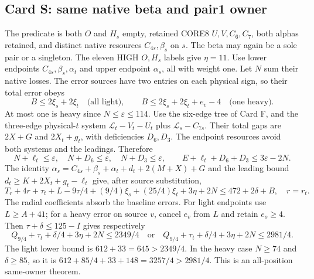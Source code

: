 \documentclass[11pt,letterpaper]{article}
\theoremstyle{definition}\newtheorem{definition}[theorem]{Definition}
\begin{document}
\subsection{Card S: same native beta and pair1 owner}\label{sec:z4-cardS}
The predicate is both $O$ and $H_s$ empty, retained CORE8 $U,V,C_6,C_7$, both alphas retained, and distinct native resources $C_{4s},\beta_s$ on $s$. The beta may again be a sole pair or a singleton. The eleven HIGH $O,H_s$ labels give $\eta=11$.
Use lower endpoints $C_{4s},\beta_s,\alpha_t$ and upper endpoint $\alpha_s$, all with weight one. Let $N$ sum their native losses. The error sources have two entries on each physical sign, so their total error obeys
\[
 B\le2\xi_s+2\xi_t\quad\text{(all light)},\qquad
 B\le2\xi_s+2\xi_t+e_v-4\quad\text{(one heavy)}.
\]
At most one is heavy since $N\le\varepsilon\le114$.
Use the six-edge tree of Card F, and the three-edge physical-$t$ system $\mathcal L_t-V_t-U_t$ plus $\mathcal L_s-C_{7s}$. Their total gaps are $2X+G$ and $2X_t+g_t$, with deficiencies $D_6,D_3$. The endpoint resources avoid both systems and the leadings. Therefore
\[
 N+\ell_t\le\varepsilon,\quad N+D_6\le\varepsilon,\quad N+D_3\le\varepsilon,
 \qquad E+\ell_t+D_6+D_3\le3\varepsilon-2N.
\]
The identity $\alpha_s=C_{4s}+\beta_s+\alpha_t+d_t+2(M+X)+G$ and the leading bound $d_t\ge K+2X_t+g_t-\ell_t$ give, after source substitution,
\[
 T_r+4r+\tau_t+L-9\tau/4+(9/4)\xi_s+(25/4)\xi_t+3\eta+2N
 \le472+2\delta+B,\quad r=r_t.
\]
The radial coefficients absorb the baseline errors. For light endpoints use $L\ge A+41$; for a heavy error on source $v$, cancel $e_v$ from $L$ and retain $e_o\ge4$. Then $\tau+\delta\le125-I$ gives respectively
\[
 Q_{9/4}+\tau_t+\delta/4+3\eta+2N\le2349/4
 \quad\text{or}\quad
 Q_{9/4}+\tau_t+\delta/4+3\eta+2N\le2981/4.
\]
The light lower bound is $612+33=645>2349/4$. In the heavy case $N\ge74$ and $\delta\ge85$, so it is $612+85/4+33+148=3257/4>2981/4$. This is an all-position same-owner theorem.
\end{document}
